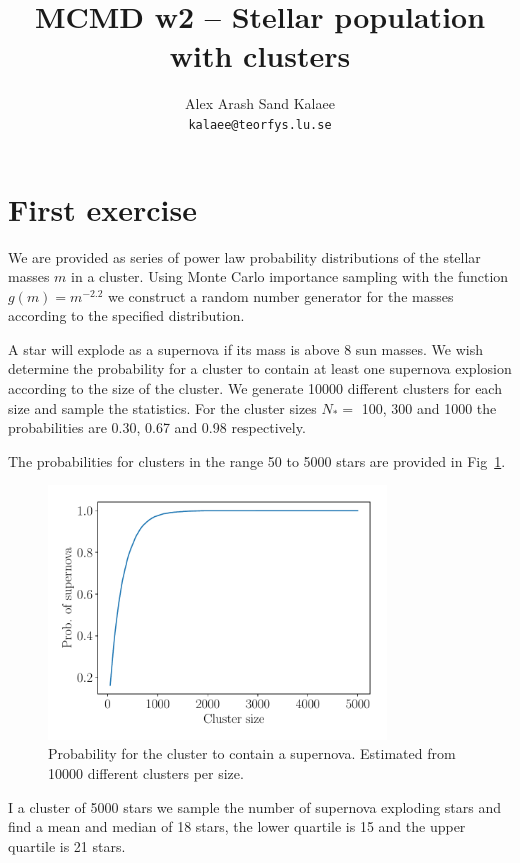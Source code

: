\documentclass{article}
\begin{document}
\title{MCMD w2 -- Stellar population with clusters}
\author{Alex Arash Sand Kalaee\\ \texttt{kalaee@teorfys.lu.se}}
\maketitle
\section{First exercise}
We are provided as series of power law probability distributions
of the stellar masses $m$ in a cluster.
Using Monte Carlo importance sampling with the function $g(m) = m^{-2.2}$
we construct a random number generator for the masses according to the
specified distribution.

A star will explode as a supernova if its mass is above 8 sun masses.
We wish determine the probability for a cluster to contain at least one
supernova explosion according to the size of the cluster.
We generate 10000 different clusters for each size and sample the
statistics.
For the cluster sizes $N_*=$ 100, 300 and 1000 the probabilities are
0.30, 0.67 and 0.98 respectively.

The probabilities for clusters in the range 50 to 5000 stars are provided
in Fig~\ref{supernova}.

\begin{figure}
\centering
\includegraphics[width=0.8\textwidth]{supernova.pdf}
\caption{Probability for the cluster to contain a supernova. Estimated from
10000 different clusters per size.}
\label{supernova}
\end{figure}

I a cluster of 5000 stars we sample the number of supernova exploding stars
and find a mean and median of 18 stars, the lower quartile is 15 and the
upper quartile is 21 stars.
\end{document}
